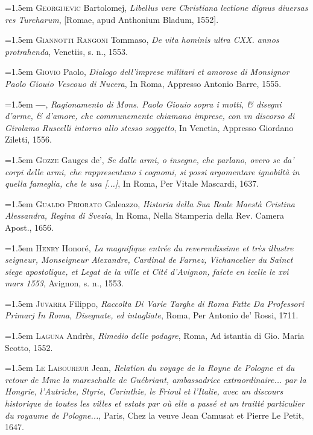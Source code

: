 \documentclass[12pt,twoside,openany]{book}
\newenvironment{PurhBibliography}
  {%
    \par
    \setlength{\parindent}{0pt}%
    \setlength{\leftskip}{0pt}%
  }
  {%
    \par
  }
\begin{document}
\begin{PurhBibliography}
\noindent\hangindent=1.5em \textsc{Georgijevic} Bartolomej, \textit{Libellus vere Christiana lectione dignus diuersas res Turcharum}, [Romae, apud Anthonium Bladum, 1552].\par
\noindent\hangindent=1.5em \textsc{Giannotti Rangoni} Tommaso, \textit{De vita hominis ultra CXX. annos protrahenda}, Venetiis, s. n., 1553.\par
\noindent\hangindent=1.5em \textsc{Giovio} Paolo,\textit{ Dialogo dell’imprese militari et amorose di Monsignor Paolo Giouio Vescouo di Nucera}, In Roma, Appresso Antonio Barre, 1555.\par
\noindent\hangindent=1.5em \textbf{—}, \textit{Ragionamento di Mons. Paolo Giouio sopra i motti, \& disegni d’arme, \& d’amore, che communemente chiamano imprese, con vn discorso di Girolamo Ruscelli intorno allo stesso soggetto}, In Venetia, Appresso Giordano Ziletti, 1556.\par
\noindent\hangindent=1.5em \textsc{Gozze} Gauges de’, \textit{Se dalle armi, o insegne, che parlano, overo se da’ corpi delle armi, che rappresentano i cognomi, si possi argomentare ignobiltà in quella fameglia, che le usa [...]}, In Roma, Per Vitale Mascardi, 1637.\par
\noindent\hangindent=1.5em \textsc{Gualdo Priorato} Galeazzo, \textit{Historia della Sua Reale Maestà Cristina Alessandra, Regina di Svezia}, In Roma, Nella Stamperia della Rev. Camera Apost., 1656.\par
\noindent\hangindent=1.5em \textsc{Henry} Honoré, \textit{La magnifique entrée du reverendissime et très illustre seigneur, Monseigneur Alexandre, Cardinal de Farnez, Vichancelier du Sainct siege apostolique, et Legat de la ville et Cité d’Avignon, faicte en icelle le xvi mars 1553}, Avignon, s. n., 1553.\par
\noindent\hangindent=1.5em \textsc{Juvarra} Filippo,\textit{ Raccolta Di Varie Targhe di Roma Fatte Da Professori Primarj In Roma, Disegnate, ed intagliate}, Roma, Per Antonio de’ Rossi, 1711.\par
\noindent\hangindent=1.5em \textsc{Laguna} Andrès, \textit{Rimedio delle podagre}, Roma, Ad istantia di Gio. Maria Scotto, 1552.\par
\noindent\hangindent=1.5em \textsc{Le Laboureur} Jean, \textit{Relation du voyage de la Royne de Pologne et du retour de Mme la mareschalle de Guébriant, ambassadrice extraordinaire... par la Hongrie, l’Autriche, Styrie, Carinthie, le Frioul et l’Italie, avec un discours historique de toutes les villes et estats par où elle a passé et un traitté particulier du royaume de Pologne...}, Paris, Chez la veuve Jean Camusat et Pierre Le Petit, 1647.\par

\end{PurhBibliography}
\end{document}
